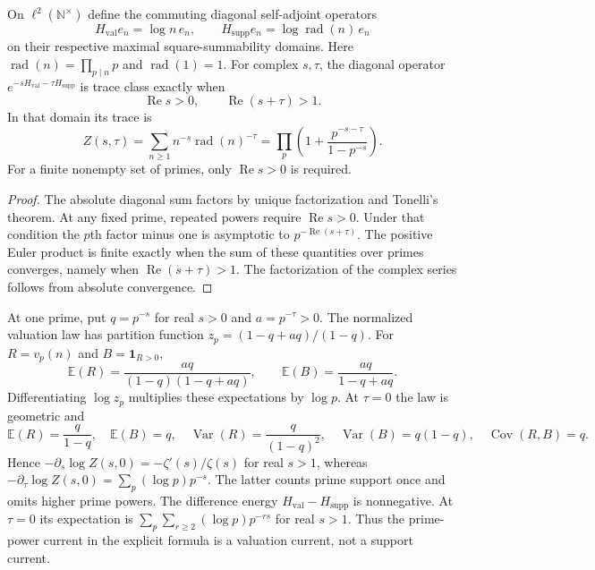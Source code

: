 \begin{proposition}
\label{syn-arith:two-energies}
On $\ell^2(\mathbb N^\times)$ define the commuting diagonal self-adjoint operators
\[
 H_{\mathrm{val}}e_n=\log n\,e_n,\qquad
 H_{\mathrm{supp}}e_n=\log\operatorname{rad}(n)\,e_n
\]
on their respective maximal square-summability domains.
Here $\operatorname{rad}(n)=\prod_{p\mid n}p$ and $\operatorname{rad}(1)=1$.
For complex $s,\tau$, the diagonal operator
$e^{-sH_{\mathrm{val}}-\tau H_{\mathrm{supp}}}$ is trace class exactly when
\[
 \operatorname{Re}s>0,\qquad \operatorname{Re}(s+\tau)>1.
\]
In that domain its trace is
\[
 Z(s,\tau)=\sum_{n\geq1}n^{-s}\operatorname{rad}(n)^{-\tau}
 =\prod_p\left(1+\frac{p^{-s-\tau}}{1-p^{-s}}\right).
\]
For a finite nonempty set of primes, only $\operatorname{Re}s>0$ is required.
\end{proposition}
\begin{proof}
The absolute diagonal sum factors by unique factorization and Tonelli's theorem.
At any fixed prime, repeated powers require $\operatorname{Re}s>0$.
Under that condition the $p$th factor minus one is asymptotic to
$p^{-\operatorname{Re}(s+\tau)}$.  The positive Euler product is finite exactly
when the sum of these quantities over primes converges, namely when
$\operatorname{Re}(s+\tau)>1$.
The factorization of the complex series follows from absolute convergence.
\end{proof}

At one prime, put $q=p^{-s}$ for real $s>0$ and $a=p^{-\tau}>0$.
The normalized valuation law has partition function
$z_p=(1-q+aq)/(1-q)$.
For $R=v_p(n)$ and $B=\mathbf1_{R>0}$,
\[
 \mathbb E(R)=\frac{aq}{(1-q)(1-q+aq)},\qquad
 \mathbb E(B)=\frac{aq}{1-q+aq}.
\]
Differentiating $\log z_p$ multiplies these expectations by $\log p$.
At $\tau=0$ the law is geometric and
\[
 \mathbb E(R)=\frac q{1-q},\quad \mathbb E(B)=q,\quad
 \operatorname{Var}(R)=\frac q{(1-q)^2},\quad
 \operatorname{Var}(B)=q(1-q),\quad \operatorname{Cov}(R,B)=q.
\]
Hence $-\partial_s\log Z(s,0)=-\zeta'(s)/\zeta(s)$ for real $s>1$,
whereas $-\partial_\tau\log Z(s,0)=\sum_p(\log p)p^{-s}$.
The latter counts prime support once and omits higher prime powers.
The difference energy $H_{\mathrm{val}}-H_{\mathrm{supp}}$ is nonnegative.
At $\tau=0$ its expectation is
$\sum_p\sum_{r\geq2}(\log p)p^{-rs}$ for real $s>1$.
Thus the prime-power current in the explicit formula is a valuation
current, not a support current.

